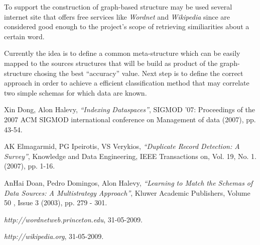 \documentclass[12pt,a4paper]{article}
\begin{document}
To support the construction of graph-based structure may be used several internet site that offers free services like \emph{Wordnet}\cite{wordNet} and \emph{Wikipedia}\cite{wikipedia} since are considered good enough to the project's scope of retrieving similiarities about a certain word.

Currently the idea is to define a common meta-structure which can be easily mapped to the sources structures that will be build as product of the graph-structure chosing the best ``accuracy'' value. Next step is to define the correct approach in order to achieve a efficient classification method that may correlate two simple schemas for which data are known.

\begin{thebibliography}{9}
 Xin Dong, Alon Halevy, \emph{``Indexing Dataspaces''}, SIGMOD '07: Proceedings of the 2007 ACM SIGMOD international conference on Management of data (2007), pp. 43-54.

 AK Elmagarmid, PG Ipeirotis, VS Verykios, \emph{``Duplicate Record Detection: A Survey''}, Knowledge and Data Engineering, IEEE Transactions on, Vol. 19, No. 1. (2007), pp. 1-16.

 AnHai Doan, Pedro Domingos, Alon Halevy, \emph{``Learning to Match the Schemas of Data Sources: A Multistrategy Approach''}, Kluwer Academic Publishers, Volume 50 ,  Issue 3 (2003), pp. 279 - 301.

 \emph{http://wordnetweb.princeton.edu}, 31-05-2009.

 \emph{http://wikipedia.org}, 31-05-2009.

\end{thebibliography}
\end{document}
